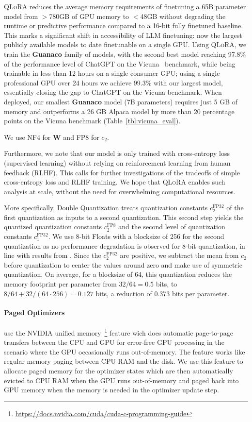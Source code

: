 \textsc{QLoRA} reduces the average memory requirements of finetuning a 65B parameter model from $>$780GB of GPU memory to $<$48GB without degrading the runtime or predictive performance compared to a 16-bit fully finetuned baseline. This marks a significant shift in accessibility of LLM finetuning: now the largest publicly available models to date finetunable on a single GPU. Using \textsc{QLoRA}, we train the \textbf{Guanaco} family of models, with the second best model reaching 97.8\% of the performance level of ChatGPT on the Vicuna~\citep{vicuna2023} benchmark, while being trainable in less than 12 hours on a single consumer GPU; using a single professional GPU over 24 hours we achieve 99.3\% with our largest model, essentially closing the gap to ChatGPT on the Vicuna benchmark. When deployed, our smallest \textbf{Guanaco} model (7B parameters) requires just 5 GB of memory and outperforms a 26 GB Alpaca model by more than 20 percentage points on the Vicuna benchmark (Table~\ref{tbl:vicuna_eval}).

We use NF4 for $\mathbf{W}$ and FP8 for $c_2$.

Furthermore, we note that our model is only trained with cross-entropy loss (supervised learning) without relying on reinforcement learning from human feedback (RLHF). This calls for further investigations of the tradeoffs of simple cross-entropy loss and RLHF training. We hope that \textsc{QLoRA} enables such analysis at scale, without the need for overwhelming computational resources.

More specifically, Double Quantization treats quantization constants $c_2^{\text{FP32}}$ of the first quantization as inputs to a second quantization. This second step yields the quantized quantization constants $c_2^{\text{FP8}}$ and the second level of quantization constants $c_1^{\text{FP32}}$. We use 8-bit Floats with a blocksize of 256 for the second quantization as no performance degradation is observed for 8-bit quantization, in line with results from \citet{dettmers2022case}. 
Since the $c_2^{\text{FP32}}$ are positive, we subtract the mean from $c_2$ before quantization to center the values around zero and make use of symmetric quantization. On average, for a blocksize of 64, this quantization reduces the memory footprint per parameter from $32/64=0.5$ bits, to $8/64 + 32/(64\cdot256) = 0.127$ bits, a reduction of 0.373 bits per parameter. 

\paragraph{Paged Optimizers} use the NVIDIA unified memory~\footnote{\tiny \url{https://docs.nvidia.com/cuda/cuda-c-programming-guide}} feature wich does automatic page-to-page transfers between the CPU and GPU for error-free GPU processing in the scenario where the GPU occasionally runs out-of-memory. The feature works like regular memory paging between CPU RAM and the disk. We use this feature to allocate paged memory for the optimizer states which are then automatically evicted to CPU RAM when the GPU runs out-of-memory and paged back into GPU memory when the memory is needed in the optimizer update step.


